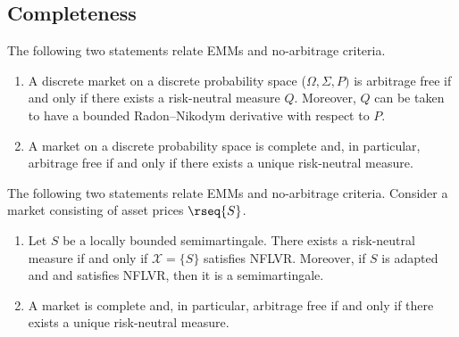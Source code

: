 \subsection{Completeness}


    \begin{theorem}
        The following two statements relate EMMs and no-arbitrage criteria.
        \begin{enumerate}
            \item A discrete market on a discrete probability space ($\Omega,\Sigma,P)$ is arbitrage free if and only if there exists a risk-neutral measure $Q$. Moreover, $Q$ can be taken to have a bounded Radon--Nikodym derivative with respect to $P$.
            \item A market on a discrete probability space is complete and, in particular, arbitrage free if and only if there exists a unique risk-neutral measure.
        \end{enumerate}
    \end{theorem}

    \begin{theorem}
        The following two statements relate EMMs and no-arbitrage criteria. Consider a market consisting of asset prices $\rseq{S}$.
        \begin{enumerate}
            \item Let $S$ be a locally bounded semimartingale. There exists a risk-neutral measure if and only if $\mathcal{X}=\{S\}$ satisfies NFLVR. Moreover, if $S$ is adapted and \cdlg and satisfies NFLVR, then it is a semimartingale.
            \item A market is complete and, in particular, arbitrage free if and only if there exists a unique risk-neutral measure.
        \end{enumerate}
    \end{theorem}

